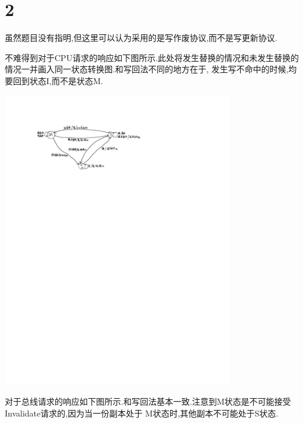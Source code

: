\documentclass[adobefonts, nocap]{ctexart}
\begin{document}
  \section*{2}
    虽然题目没有指明,但这里可以认为采用的是写作废协议,而不是写更新协议.

    不难得到对于CPU请求的响应如下图所示.此处将发生替换的情况和未发生替换的情况一并画入同一状态转换图.和写回法不同的地方在于,
    发生写不命中的时候,均要回到状态I,而不是状态M.

    \begin{center}
      \includegraphics[width=10cm]{1-crop.pdf}
    \end{center}

    对于总线请求的响应如下图所示.和写回法基本一致.注意到M状态是不可能接受Invalidate请求的,因为当一份副本处于
    M状态时,其他副本不可能处于S状态.
\end{document}
